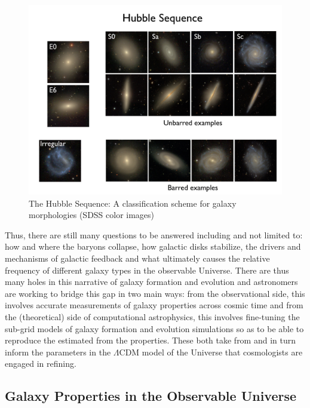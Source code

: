 \begin{figure}
\includegraphics[width=\textwidth]{figures/hubble.jpeg}
\caption[ The Hubble Sequence: A classification scheme for galaxy morphologies (SDSS color images)]
{The Hubble Sequence: A classification scheme for galaxy morphologies (SDSS color images)
\label{fig:hubble_classification}}
\end{figure}

Thus, there are still many questions to be answered including and not limited to: how and where the baryons collapse, how galactic disks stabilize, the drivers and mechanisms of galactic feedback and what ultimately causes the relative frequency of different galaxy types in the observable Universe. There are thus many holes in this narrative of galaxy formation and evolution and astronomers are working to bridge this gap in two main ways: from the observational side, this involves accurate measurements of galaxy properties across cosmic time and from the (theoretical) side of computational astrophysics, this involves fine-tuning the sub-grid models of galaxy formation and evolution simulations so as to be able to reproduce the estimated from the properties. These both take from and in turn inform the parameters in the $\Lambda$CDM model of the Universe that cosmologists are engaged in refining.\\

\subsection{Galaxy Properties in the Observable Universe}
\label{sec: gal_prop}

